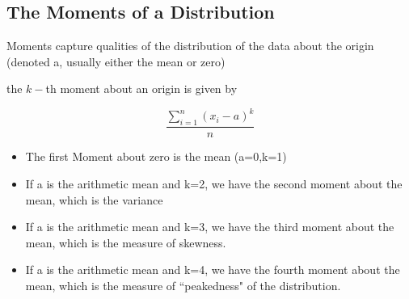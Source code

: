 



\subsection{The Moments of a Distribution}
Moments capture qualities of the distribution of the data about the origin (denoted a, usually either the mean or zero)

the $k-$th moment about an origin is given by

\[ \frac{\sum^{n}_{i=1} (x_i - a)^k}{n} \]


\begin{itemize}
\item The first Moment about zero is the mean (a=0,k=1)

\item If a is the arithmetic mean and k=2, we have the second moment about the mean, which is the variance

\item If a is the arithmetic mean and k=3, we have the third moment about the mean, which is 
the measure of skewness.

\item If a is the arithmetic mean and k=4, we have the fourth moment about the mean, which is 
the measure of ``peakedness" of the distribution.

\end{itemize}

